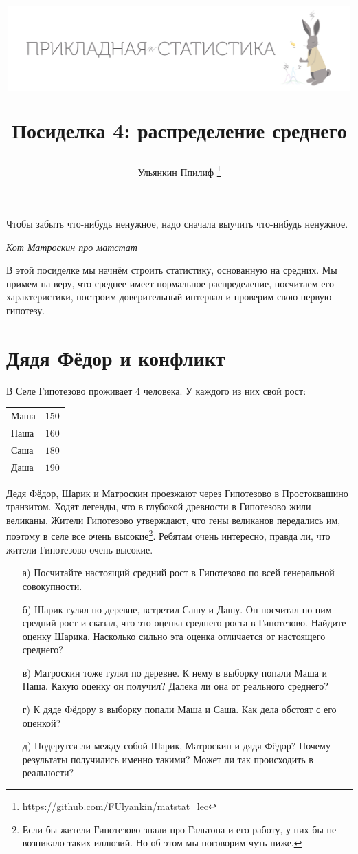 \documentclass[12pt, a4paper, oneside]{article}
\title{
\begin{center} 
\includegraphics[width=0.99\textwidth]{logo.png}
\end{center}

Посиделка 4: распределение среднего}
\date{ } %
\author{Ульянкин Ппилиф \thanks{\url{https://github.com/FUlyankin/matstat_lec}}}
\begin{document}

\maketitle

\epigraph{Чтобы забыть что-нибудь ненужное, надо сначала выучить что-нибудь ненужное.}{\textit{Кот Матроскин про матстат}}

В этой посиделке мы начнём строить статистику, основанную на средних. Мы примем на веру, что среднее имеет нормальное распределение, посчитаем его характеристики, построим доверительный интервал и проверим свою первую гипотезу.  

\section{Дядя Фёдор и конфликт}

В Селе  Гипотезово проживает $4$ человека. У каждого из них свой рост:

\begin{center}
	\begin{tabular}{lc}
		\toprule
		Маша &  $150$\\
		Паша &  $160$\\
		Саша &  $180$\\
		Даша &  $190$\\ 
		\bottomrule
	\end{tabular}	
\end{center}

Дедя Фёдор, Шарик и Матроскин проезжают через Гипотезово в Простоквашино транзитом. Ходят легенды, что в глубокой древности в Гипотезово жили великаны. Жители Гипотезово утверждают, что гены великанов передались им, поэтому в селе все очень высокие\footnote{Если бы жители Гипотезово знали про Гальтона и его работу, у них бы не возникало таких иллюзий. Но об этом мы поговорим чуть ниже.}. Ребятам очень интересно, правда ли, что жители Гипотезово очень высокие.

\begin{enumerate} 
	\item[а)] Посчитайте настоящий средний рост в Гипотезово по всей генеральной совокупности.
	\item[б)] Шарик гулял по деревне, встретил Сашу и Дашу. Он посчитал по ним средний рост и сказал, что это оценка среднего роста в Гипотезово. Найдите оценку Шарика. Насколько сильно эта оценка отличается от настоящего среднего? 
	\item[в)] Матроскин тоже гулял по деревне. К нему в выборку попали Маша и Паша. Какую оценку он получил? Далека ли она от реального среднего? 
	\item[г)] К дяде Фёдору в выборку попали Маша и Саша. Как дела обстоят с его оценкой? 
	\item[д)] Подерутся ли между собой Шарик, Матроскин и дядя Фёдор? Почему результаты получились именно такими? Может ли так происходить в реальности? 
\end{enumerate} 
\end{document}
